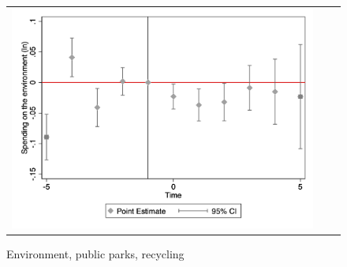 \begin{figure}[!ht]
\begin{tabular}{@{}ccc@{}}
\begin{minipage}[t]{0.32\textwidth}
            \centering
            \caption{Environment, public parks, recycling}
            \includegraphics[width=\linewidth]{images/total population/caseventdd_ln_q4_09_step1.jpg}
            \label{fig:casenvironment}
        \end{minipage}
    \end{tabular}
\end{figure}

